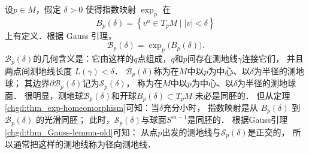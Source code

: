 \begin{remark}\label{chgd:rmk_geo-sph}
设$p \in M$，假定 $\delta>0$ 使得指数映射 $\exp _p$ 在
\begin{equation}\label{chgd:eqn_Ball}
    B_p(\delta)=\left\{v^a \in T_p M \mid  |v|<\delta\right\}
\end{equation}
上有定义．根据 Gauss 引理，
\begin{equation}\label{chgd:eqn_gdBall}
    \mathscr{B}_p(\delta)  =\exp _p\bigl(B_p(\delta)\bigr) .
\end{equation}
$\mathscr{B}_p(\delta)$的几何含义是：它由这样的$q$点组成，$q$和$p$间存在测地线$\gamma$连接它们，  
并且两点间测地线长度 $L(\gamma)<\delta$．
$\mathscr{B}_p(\delta)$称为在$M$中以$p$为中心、以$\delta$为半径的{\heiti 测地球}；
其边界$\partial \mathscr{B}_p(\delta)$记为$\mathscr{S}_p(\delta)$，
称为在$M$中以$p$为中心、以$\delta$为半径的{\heiti 测地球面}．
很明显，测地球$\mathscr{B}_p(\delta)$和开球$B_p(\delta) \subset T_p M$ 未必是同胚的．
但从定理\ref{chgd:thm_exp-homeomorphism}可知：当$\delta$充分小时，
指数映射是从 $B_p(\delta)$ 到 $\mathscr{B}_p(\delta)$ 的光滑同胚；
此时，$\mathscr{S}_p(\delta)$与球面$S^{m-1}$是同胚的．
根据Gauss引理\ref{chgd:thm_Gauss-lemma-old}可知：
从点$p$出发的测地线与$\mathscr{S}_p(\delta)$是正交的，
所以通常把这样的测地线称为{\heiti 径向测地线}． 
\end{remark}

  


 

